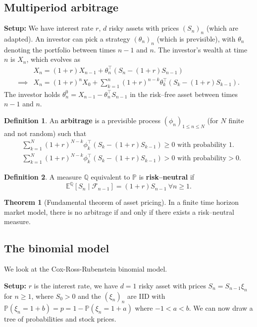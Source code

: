 \documentclass{article}
\theoremstyle{definition}
\newtheorem{theorem}{Theorem}[section]
\newtheorem{defn}{Definition}[section]
\begin{document}
\subsection{Multiperiod arbitrage}
\textbf{Setup:} We have interest rate $r$, $d$ risky assets with prices $(S_n)_n$ (which are adapted). An investor can pick a strategy $(\theta_n)_n$ (which is previsible), with $\theta_n$ denoting the portfolio between times $n-1$ and $n$. The investor's wealth at time $n$ is $X_n$, which evolves as 
\begin{align*}
    &X_n = (1+r)X_{n-1} + \theta_n^\top(S_n-(1+r)S_{n-1})\\
    \implies &X_n = (1+r)^n X_0 + \sum_{k=1}^{n} (1+r)^{n-k}\theta_k^\top(S_k - (1+r)S_{k-1}).
\end{align*}
The investor holds $\theta^0_n = X_{n-1} - \theta_n^\top S_{n-1}$ in the risk--free asset between times $n-1$ and $n$.
\begin{defn}
    An \textbf{arbitrage} is a previsible process $(\phi_n)_{1\le n\le N}$ (for $N$ finite and not random) such that 
    \begin{align*}
        &\sum_{k=1}^{N} (1+r)^{N-k} \phi_k^\top(S_k-(1+r)S_{k-1})\ge 0 \text{ with probability 1.}\\
        &\sum_{k=1}^{N} (1+r)^{N-k} \phi_k^\top(S_k-(1+r)S_{k-1})>0 \text{ with probability}> 0.
    \end{align*}
\end{defn}
\begin{defn}
    A measure $\mathbb{Q}$ equivalent to $\mathbb{P}$ is \textbf{risk--neutral} if $$\mathbb{E}^\mathbb{Q}[S_n \mid \mathcal{F}_{n-1}] = (1+r)S_{n-1} ~\forall n\ge 1.$$
\end{defn}
\begin{theorem}[Fundamental theorem of asset pricing]
    In a finite time horizon market model, there is no arbitrage if and only if there exists a risk--neutral measure.
\end{theorem}
\subsection{The binomial model}
We look at the Cox-Ross-Rubenstein binomial model.

\textbf{Setup:} $r$ is the interest rate, we have $d=1$ risky asset with prices $S_n=S_{n-1}\xi_n$ for $n\ge 1$, where $S_0>0$ and the $(\xi_n)_n$ are IID with $\mathbb{P}(\xi_n=1+b)=p=1- \mathbb{P}(\xi_n = 1+a)$ where $-1<a<b$. We can now draw a tree of probabilities and stock prices.
\end{document}
